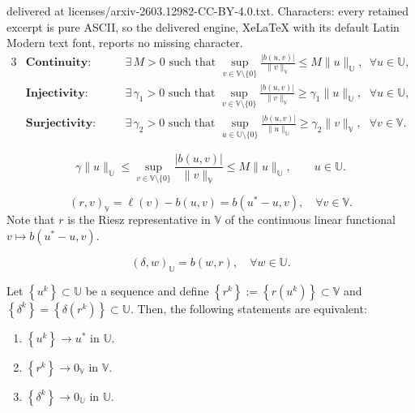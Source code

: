 \documentclass[10pt,a4paper]{amsart}
\begin{document}
delivered at licenses/arxiv-2603.12982-CC-BY-4.0.txt. Characters: every retained excerpt is pure ASCII, so the delivered engine, XeLaTeX with its default Latin Modern text font, reports no missing character.
\begin{alignat}{3}
&\textbf{Continuity:}& \quad &\exists\, M>0 \text{ such that } \sup_{v \in \mathbb{V} \setminus \{0\}} \frac{|b(u,v)|}{\|v\|_\mathbb{V}} \leq M \|u\|_\mathbb{U}, \quad &&\forall u \in \mathbb{U},\label{eq:continuity} \\
&\textbf{Injectivity:}& \quad &\exists\, \gamma_1>0 \text{ such that } \sup_{v \in \mathbb{V} \setminus \{0\}} \frac{|b(u,v)|}{\|v\|_\mathbb{V}} \geq \gamma_1 \|u\|_\mathbb{U}, \quad &&\forall u \in \mathbb{U}, \label{eq:inf-sup} \\
&\textbf{Surjectivity:}& \quad &\exists\, \gamma_2>0 \text{ such that } \sup_{u \in \mathbb{U} \setminus \{0\}} \frac{|b(u,v)|}{\|u\|_\mathbb{U}} \geq \gamma_2 \|v\|_\mathbb{V}, \quad &&\forall v \in \mathbb{V}. \label{eq:surjectivity}
\end{alignat}

\begin{equation}\label{eq:dual_inf-sup}
\gamma \|u\|_\mathbb{U} \leq \sup_{v\in\mathbb{V}\setminus\{0\}} \frac{|b(u,v)|}{\|v\|_\mathbb{V}} \leq M \|u\|_\mathbb{U},\qquad u\in\mathbb{U}.
\end{equation}

\begin{equation}\label{eq:residual}
(r,v)_{\mathbb{V}} = \ell(v) - b(u,v)=b(u^*-u,v), \quad \forall v\in \mathbb{V}.
\end{equation} Note that $r$ is the Riesz representative in $\mathbb{V}$ of the continuous linear functional $v\mapsto b(u^*-u,v)$.

\begin{equation}\label{eq:delta}
(\delta,w)_{\mathbb{U}} = b(w,r), \quad \forall w\in \mathbb{U}.
\end{equation}

\begin{proposition}\label{prop:equivalences}
Let $\left\{u^k\right\}\subset\mathbb U$ be a sequence and define $\left\{r^k\right\}:=\left\{r(u^k)\right\}\subset \mathbb V$ and 
$\left\{\delta^k\right\}=\left\{\delta(r^k)\right\}\subset\mathbb U$.
Then, the following statements are equivalent:
\begin{enumerate}
\item[(i)] $\left\{u^k\right\}\to u^*$ in $\mathbb U$.
\item[(ii)] $\left\{r^k\right\}\to 0_\mathbb V$ in $\mathbb V$.
\item[(iii)] $\left\{\delta^k\right\}\to 0_\mathbb U$ in $\mathbb U$.
\end{enumerate}
\end{proposition}
\end{document}
